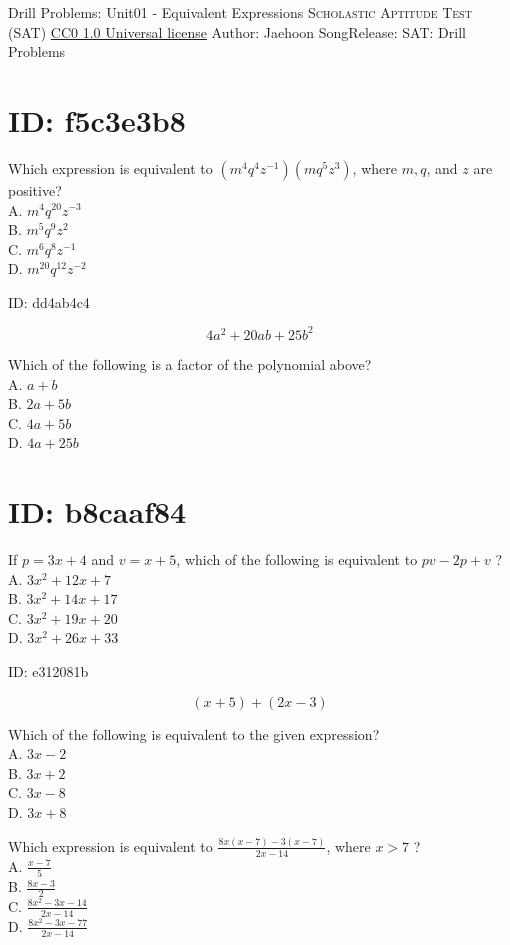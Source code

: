 \newpage\handout
{Drill Problems: Unit01 - Equivalent Expressions}
{\textsc{Scholastic Aptitude Test (SAT)}}
{\href{https://creativecommons.org/publicdomain/zero/1.0/}{CC0 1.0 Universal license}}
{Author: Jaehoon Song}{Release: \generatedOn}
{SAT: Drill Problems}

\section*{ID: f5c3e3b8}
Which expression is equivalent to $\left(m^{4} q^{4} z^{-1}\right)\left(m q^{5} z^{3}\right)$, where $m, q$, and $z$ are positive?\\
A. $m^{4} q^{20} z^{-3}$\\
B. $m^{5} q^{9} z^{2}$\\
C. $m^{6} q^{8} z^{-1}$\\
D. $m^{20} q^{12} z^{-2}$

ID: dd4ab4c4

$$
4 a^{2}+20 a b+25 b^{2}
$$

Which of the following is a factor of the polynomial above?\\
A. $a+b$\\
B. $2 a+5 b$\\
C. $4 a+5 b$\\
D. $4 a+25 b$

\section*{ID: b8caaf84}
If $p=3 x+4$ and $v=x+5$, which of the following is equivalent to $p v-2 p+v$ ?\\
A. $3 x^{2}+12 x+7$\\
B. $3 x^{2}+14 x+17$\\
C. $3 x^{2}+19 x+20$\\
D. $3 x^{2}+26 x+33$

ID: e312081b

$$
(x+5)+(2 x-3)
$$

Which of the following is equivalent to the given expression?\\
A. $3 x-2$\\
B. $3 x+2$\\
C. $3 x-8$\\
D. $3 x+8$

Which expression is equivalent to $\frac{8 x(x-7)-3(x-7)}{2 x-14}$, where $x>7$ ?\\
A. $\frac{x-7}{5}$\\
B. $\frac{8 x-3}{2}$\\
C. $\frac{8 x^{2}-3 x-14}{2 x-14}$\\
D. $\frac{8 x^{2}-3 x-77}{2 x-14}$

